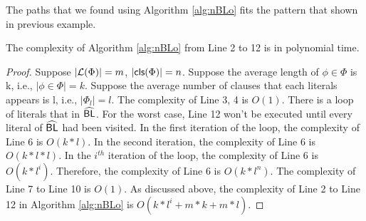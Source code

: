 The paths that we found using Algorithm \ref{alg:nBLo} fits the pattern that shown in previous example.

\begin{theorem}
The complexity of Algorithm \ref{alg:nBLo} from Line 2 to 12 is in polynomial time.
\end{theorem}
\begin{proof}
Suppose $|{\cal L}(\Phi)|=m$, $|\textsf{cls}(\Phi)|=n$.
Suppose the average length of $\phi\in\Phi$ is k, i.e., $|\phi\in\Phi|=k$.
Suppose the average number of clauses that each literals appears is l, i.e., $|\Phi_l|=l$.
The complexity of Line 3, 4 is $O(1)$. There is a loop of literals that in ${\sf \widehat{BL}}$. For the worst case, Line 12 won't be executed until every literal of ${\sf \widehat{BL}}$ had been visited. In the first iteration of the loop, the complexity of Line 6 is $O(k*l)$. In the second iteration, the complexity of Line 6 is $O(k*l*l)$. In the $i^{th}$ iteration of the loop, the complexity of Line 6 is $O(k*l^i)$. Therefore, the complexity of Line 6 is $O(k*l^n)$. The complexity of Line 7 to Line 10 is $O(1)$.
As discussed above, the complexity of Line 2 to Line 12 in Algorithm \ref{alg:nBLo} is $O(k*l^i+m*k+m*l)$.
\end{proof}

\medskip


